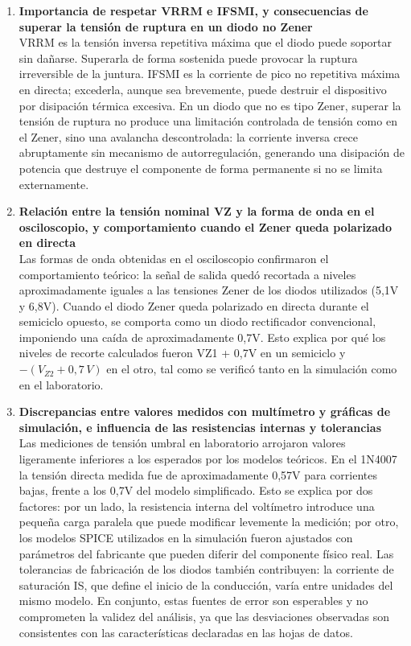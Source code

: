\begin{enumerate}[leftmargin=*, label=\textbf{\arabic*.}]
    \item \textbf{Importancia de respetar VRRM e IFSMI, y consecuencias de superar la tensión de ruptura en un diodo no Zener}\\
    VRRM es la tensión inversa repetitiva máxima que el diodo puede soportar sin dañarse. Superarla de forma sostenida puede provocar la ruptura irreversible de la juntura. IFSMI es la corriente de pico no repetitiva máxima en directa; excederla, aunque sea brevemente, puede destruir el dispositivo por disipación térmica excesiva. En un diodo que no es tipo Zener, superar la tensión de ruptura no produce una limitación controlada de tensión como en el Zener, sino una avalancha descontrolada: la corriente inversa crece abruptamente sin mecanismo de autorregulación, generando una disipación de potencia que destruye el componente de forma permanente si no se limita externamente.

    \item \textbf{Relación entre la tensión nominal VZ y la forma de onda en el osciloscopio, y comportamiento cuando el Zener queda polarizado en directa}\\
    Las formas de onda obtenidas en el osciloscopio confirmaron el comportamiento teórico: la señal de salida quedó recortada a niveles aproximadamente iguales a las tensiones Zener de los diodos utilizados (5,1V y 6,8V). Cuando el diodo Zener queda polarizado en directa durante el semiciclo opuesto, se comporta como un diodo rectificador convencional, imponiendo una caída de aproximadamente 0,7V. Esto explica por qué los niveles de recorte calculados fueron VZ1 + 0,7V en un semiciclo y $-(V_{Z2}+0,7\,V)$ en el otro, tal como se verificó tanto en la simulación como en el laboratorio.

    \item \textbf{Discrepancias entre valores medidos con multímetro y gráficas de simulación, e influencia de las resistencias internas y tolerancias}\\
    Las mediciones de tensión umbral en laboratorio arrojaron valores ligeramente inferiores a los esperados por los modelos teóricos. En el 1N4007 la tensión directa medida fue de aproximadamente 0,57V para corrientes bajas, frente a los 0,7V del modelo simplificado. Esto se explica por dos factores: por un lado, la resistencia interna del voltímetro introduce una pequeña carga paralela que puede modificar levemente la medición; por otro, los modelos SPICE utilizados en la simulación fueron ajustados con parámetros del fabricante que pueden diferir del componente físico real. Las tolerancias de fabricación de los diodos también contribuyen: la corriente de saturación IS, que define el inicio de la conducción, varía entre unidades del mismo modelo. En conjunto, estas fuentes de error son esperables y no comprometen la validez del análisis, ya que las desviaciones observadas son consistentes con las características declaradas en las hojas de datos. 


\end{enumerate}
